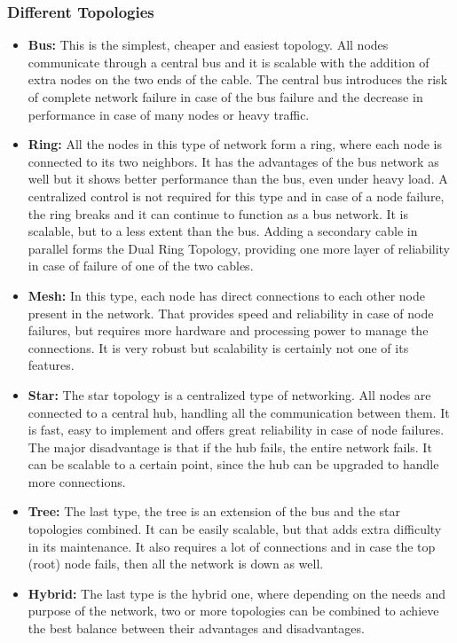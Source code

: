 \subsubsection{Different Topologies}
\begin{itemize}
\item \textbf{Bus:} This is the simplest, cheaper and easiest topology. All nodes communicate through a central bus and it is scalable with the addition of extra nodes on the two ends of the cable. The central bus introduces the risk of complete network failure in case of the bus failure and the decrease in performance in case of many nodes or heavy traffic.
\item \textbf{Ring:} All the nodes in this type of network form a ring, where each node is connected to its two neighbors. It has the advantages of the bus network as well but it shows better performance than the bus, even under heavy load. A centralized control is not required for this type and in case of a node failure, the ring breaks and it can continue to function as a bus network. It is scalable, but to a less extent than the bus. Adding a secondary cable in parallel forms the Dual Ring Topology, providing one more layer of reliability in case of failure of one of the two cables.
\item \textbf{Mesh:} In this type, each node has direct connections to each other node present in the network. That provides speed and reliability in case of node failures, but requires more hardware and processing power to manage the connections. It is very robust but scalability is certainly not one of its features.
\item \textbf{Star:} The star topology is a centralized type of networking. All nodes are connected to a central hub, handling all the communication between them. It is fast, easy to implement and offers great reliability in case of node failures. The major disadvantage is that if the hub fails, the entire network fails. It can be scalable to a certain point, since the hub can be upgraded to handle more connections.
\item \textbf{Tree:} The last type, the tree is an extension of the bus and the star topologies combined. It can be easily scalable, but that adds extra difficulty in its maintenance. It also requires a lot of connections and in case the top (root) node fails, then all the network is down as well.
\item \textbf{Hybrid:} The last type is the hybrid one, where depending on the needs and purpose of the network, two or more topologies can be combined to achieve the best balance between their advantages and disadvantages.
\end{itemize}

